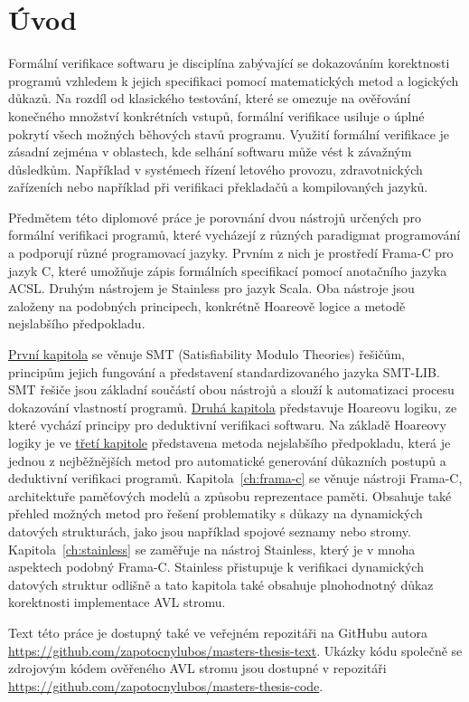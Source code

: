 \chapter*{Úvod}

Formální verifikace softwaru je disciplína zabývající se dokazováním korektnosti programů
vzhledem k jejich specifikaci pomocí matematických metod a logických důkazů.
Na rozdíl od klasického testování, které se omezuje na ověřování konečného množství konkrétních vstupů,
formální verifikace usiluje o úplné pokrytí všech možných běhových stavů programu.
Využití formální verifikace je zásadní zejména v oblastech,
kde selhání softwaru může vést k závažným důsledkům.
Například v systémech řízení letového provozu,
zdravotnických zařízeních nebo například při verifikaci překladačů a kompilovaných jazyků.

Předmětem této diplomové práce je porovnání dvou nástrojů určených pro formální verifikaci programů,
které vycházejí z různých paradigmat programování a podporují různé programovací jazyky.
Prvním z nich je prostředí Frama\mbox{-}C pro jazyk C,
které umožňuje zápis formálních specifikací pomocí anotačního jazyka ACSL\@.
Druhým nástrojem je Stainless pro jazyk Scala.
Oba nástroje jsou založeny na podobných principech,
konkrétně Hoareově logice a metodě nejslabšího předpokladu.

\hyperref[ch:smt]{První kapitola} se věnuje SMT (Satisfiability Modulo Theories) řešičům,
principům jejich fungování a představení standardizovaného jazyka SMT-LIB\@.
SMT řešiče jsou základní součástí obou nástrojů a slouží k automatizaci procesu dokazování vlastností programů.
\hyperref[ch:hoareova-logika]{Druhá kapitola} představuje Hoareovu logiku,
ze které vychází principy pro deduktivní verifikaci softwaru.
Na základě Hoareovy logiky je ve \hyperref[ch:metoda-nejslabsiho-predpokladu]{třetí kapitole}
představena metoda nejslabšího předpokladu,
která je jednou z nejběžnějších metod pro automatické generování důkazních postupů
a deduktivní verifikaci programů.
Kapitola~\ref{ch:frama-c} se věnuje nástroji Frama\mbox{-}C,
architektuře paměťových modelů a způsobu reprezentace paměti.
Obsahuje také přehled možných metod pro řešení
problematiky s důkazy na dynamických datových strukturách,
jako jsou například spojové seznamy nebo stromy.
Kapitola~\ref{ch:stainless} se zaměřuje na nástroj Stainless,
který je v mnoha aspektech podobný Frama\mbox{-}C\@.
Stainless přistupuje k verifikaci dynamických datových struktur
odlišně a tato kapitola také obsahuje plnohodnotný důkaz
korektnosti implementace AVL stromu.

\newpage

Text této práce je dostupný také ve veřejném repozitáři na GitHubu autora
\url{https://github.com/zapotocnylubos/masters-thesis-text}.
Ukázky kódu společně se zdrojovým kódem ověřeného AVL stromu
jsou dostupné v repozitáři \url{https://github.com/zapotocnylubos/masters-thesis-code}.
